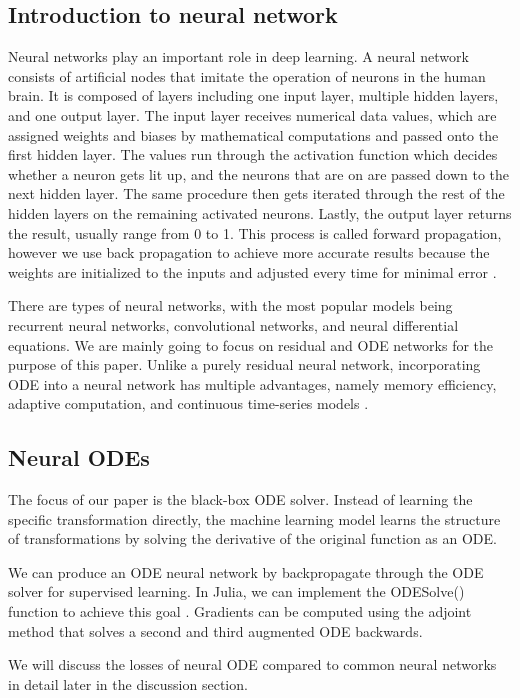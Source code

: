 \documentclass{article}
\begin{document}
\subsection{Introduction to neural network}
Neural networks play an important role in deep learning. A neural network consists of artificial nodes that imitate the operation of neurons in the human brain. It is composed of layers including one input layer, multiple hidden layers, and one output layer. The input layer receives numerical data values, which are assigned weights and biases by mathematical computations and passed onto the first hidden layer. The values run through the activation function which decides whether a neuron gets lit up, and the neurons that are on are passed down to the next hidden layer. The same procedure then gets iterated through the rest of the hidden layers on the remaining activated neurons. Lastly, the output layer returns the result, usually range from 0 to 1. This process is called forward propagation, however we use back propagation to achieve more accurate results because the weights are initialized to the inputs and adjusted every time for minimal error \cite{NduatiIntro}.

There are types of neural networks, with the most popular models being recurrent neural networks, convolutional networks, and neural differential equations. We are mainly going to focus on residual and ODE networks for the purpose of this paper. Unlike a purely residual neural network, incorporating ODE into a neural network has multiple advantages, namely memory efficiency, adaptive computation, and continuous time-series models \cite{chen2019neural}.

\subsection{Neural ODEs}
The focus of our paper is the black-box ODE solver. Instead of learning the specific transformation directly, the machine learning model learns the structure of transformations by solving the derivative of the original function as an ODE. 

We can produce an ODE neural network by backpropagate through the ODE solver for supervised learning. In Julia, we can implement the ODESolve() function to achieve this goal \cite{HoncharNODE}. Gradients can be computed using the adjoint method that solves a second and third augmented ODE backwards.

We will discuss the losses of neural ODE compared to common neural networks in detail later in the discussion section.
\end{document}
